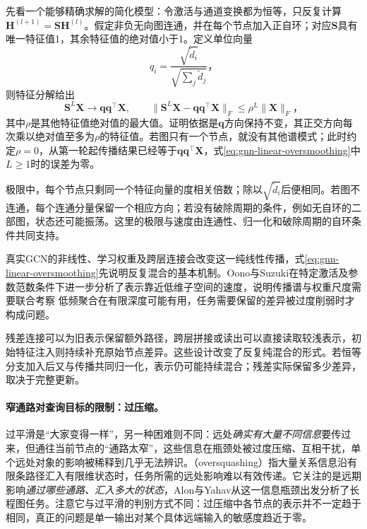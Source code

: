 先看一个能够精确求解的简化模型：令激活与通道变换都为恒等，只反复计算$\bm{H}^{(l+1)}=\bm{S}\bm{H}^{(l)}$。假定非负无向图连通，并在每个节点加入正自环；对应$\bm{S}$具有唯一特征值1，其余特征值的绝对值小于1。定义单位向量
\[
  q_i=\frac{\sqrt{\widetilde d_i}}{\sqrt{\sum_j\widetilde d_j}}\text{，}
\]
则特征分解给出
\begin{equation}
  \bm{S}^L\bm{X}\longrightarrow\bm{q}\bm{q}^{\top}\bm{X},\qquad
  \lVert\bm{S}^L\bm{X}-\bm{q}\bm{q}^{\top}\bm{X}\rVert_F
    \leq\rho^L\lVert\bm{X}\rVert_F\text{，}
  \label{eq:gnn-linear-oversmoothing}
\end{equation}
其中$\rho$是其他特征值绝对值的最大值。证明依据是$\bm{q}$方向保持不变，其正交方向每次乘以绝对值至多为$\rho$的特征值。若图只有一个节点，就没有其他谱模式；此时约定$\rho=0$，从第一轮起传播结果已经等于$\bm q\bm q^{\top}\bm X$，式\eqref{eq:gnn-linear-oversmoothing}中$L\geq1$时的误差为零。

极限中，每个节点只剩同一个特征向量的度相关倍数；除以$\sqrt{\widetilde d_i}$后便相同。若图不连通，每个连通分量保留一个相应方向；若没有破除周期的条件，例如无自环的二部图，状态还可能振荡。这里的极限与速度由连通性、归一化和破除周期的自环条件共同支持。

真实GCN的非线性、学习权重及跨层连接会改变这一纯线性传播，式\eqref{eq:gnn-linear-oversmoothing}先说明反复混合的基本机制。Oono与Suzuki在特定激活及参数范数条件下进一步分析了表示靠近低维子空间的速度，说明传播谱与权重尺度需要联合考察 低频聚合在有限深度可能有用，任务需要保留的差异被过度削弱时才构成问题。

残差连接可以为旧表示保留额外路径，跨层拼接或读出可以直接读取较浅表示，初始特征注入则持续补充原始节点差异。这些设计改变了反复纯混合的形式。若恒等分支加入后又与传播共同归一化，表示仍可能持续混合；残差实际保留多少差异，取决于完整更新。

\paragraph{窄通路对查询目标的限制：过压缩。}
\label{sec:gnn-oversquashing}

过平滑是“大家变得一样”，另一种困难则不同：远处\emph{确实有大量不同信息}要传过来，但通往当前节点的“通路太窄”，这些信息在瓶颈处被过度压缩、互相干扰，单个远处对象的影响被稀释到几乎无法辨识。（oversquashing）指大量关系信息沿有限条路径汇入有限维状态时，任务所需的远处影响难以有效传递。它关注的是远期影响\emph{通过哪些通路、汇入多大的状态}，Alon与Yahav从这一信息瓶颈出发分析了长程图任务。注意它与过平滑的判别方式不同：过压缩中各节点的表示并不一定趋于相同，真正的问题是单一输出对某个具体远端输入的敏感度趋近于零。

